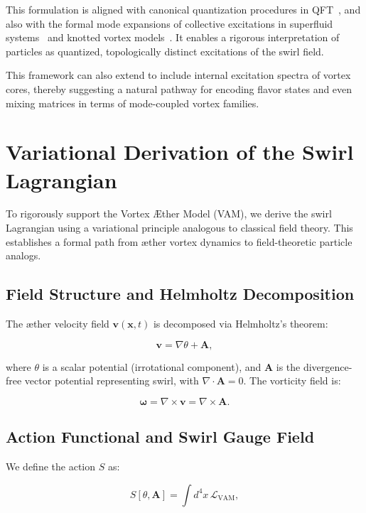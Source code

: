 \documentclass[12pt]{article}
\begin{document}
This formulation is aligned with canonical quantization procedures in QFT~\cite{verlinde2021qft}, and also with the formal mode expansions of collective excitations in superfluid systems~\cite{pethick2002bose} and knotted vortex models~\cite{kleckner2013creation}. It enables a rigorous interpretation of particles as quantized, topologically distinct excitations of the swirl field.

This framework can also extend to include internal excitation spectra of vortex cores, thereby suggesting a natural pathway for encoding flavor states and even mixing matrices in terms of mode-coupled vortex families.
\section{Variational Derivation of the Swirl Lagrangian}

To rigorously support the Vortex \AE{}ther Model (VAM), we derive the swirl Lagrangian using a variational principle analogous to classical field theory. This establishes a formal path from \ae{}ther vortex dynamics to field-theoretic particle analogs.

\subsection{Field Structure and Helmholtz Decomposition}

The \ae{}ther velocity field $\mathbf{v}(\mathbf{x}, t)$ is decomposed via Helmholtz's theorem:

\begin{equation}
\mathbf{v} = \nabla \theta + \mathbf{A},
\end{equation}

where $\theta$ is a scalar potential (irrotational component), and $\mathbf{A}$ is the divergence-free vector potential representing swirl, with $\nabla \cdot \mathbf{A} = 0$. The vorticity field is:

\begin{equation}
\boldsymbol{\omega} = \nabla \times \mathbf{v} = \nabla \times \mathbf{A}.
\end{equation}

\subsection{Action Functional and Swirl Gauge Field}

We define the action $S$ as:

\begin{equation}
S[\theta, \mathbf{A}] = \int d^4x \, \mathcal{L}_{\text{VAM}},
\end{equation}
\end{document}
